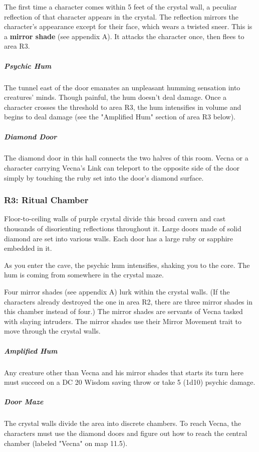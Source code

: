 \documentclass[10pt,a4paper,twoside,bg=print,twocolumn,openany,nodeprecatedcode]{dndbook}
\begin{document}
The first time a character comes within 5 feet of the crystal wall, a peculiar reflection of that character appears in the crystal. The reflection mirrors the character's appearance except for their face, which wears a twisted sneer. This is a \textbf{mirror shade} (see appendix A). It attacks the character once, then flees to area R3.

\subparagraph{Psychic Hum}
The tunnel east of the door emanates an unpleasant humming sensation into creatures' minds. Though painful, the hum doesn't deal damage. Once a character crosses the threshold to area R3, the hum intensifies in volume and begins to deal damage (see the "Amplified Hum" section of area R3 below).

\subparagraph{Diamond Door}
The diamond door in this hall connects the two halves of this room. Vecna or a character carrying Vecna's Link can teleport to the opposite side of the door simply by touching the ruby set into the door's diamond surface.

\subsubsection{R3: Ritual Chamber}
\begin{DndReadAloud}{}
Floor-to-ceiling walls of purple crystal divide this broad cavern and cast thousands of disorienting reflections throughout it. Large doors made of solid diamond are set into various walls. Each door has a large ruby or sapphire embedded in it.

As you enter the cave, the psychic hum intensifies, shaking you to the core. The hum is coming from somewhere in the crystal maze.

\end{DndReadAloud}

Four mirror shades (see appendix A) lurk within the crystal walls. (If the characters already destroyed the one in area R2, there are three mirror shades in this chamber instead of four.) The mirror shades are servants of Vecna tasked with slaying intruders. The mirror shades use their Mirror Movement trait to move through the crystal walls.

\subparagraph{Amplified Hum}
Any creature other than Vecna and his mirror shades that starts its turn here must succeed on a DC 20 Wisdom saving throw or take 5 (1d10) psychic damage.

\subparagraph{Door Maze}
The crystal walls divide the area into discrete chambers. To reach Vecna, the characters must use the diamond doors and figure out how to reach the central chamber (labeled "Vecna" on map 11.5).
\end{document}
